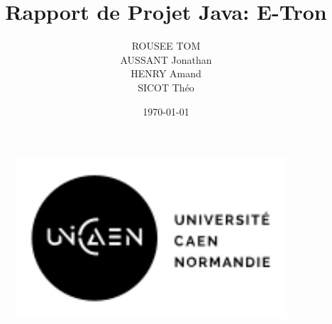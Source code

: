\documentclass{myClass}
\title{Rapport de Projet Java: E-Tron}
\author{ROUSEE TOM \\ AUSSANT Jonathan \\ HENRY Amand \\ SICOT Théo}
\date{\today}
\begin{document}
\begin{figure}
	\centering
	
		\includegraphics[width=0.9\textwidth]{images/2020_UNICAEN_LOGO_isotype-signature_horizontal_noir.png}
	
	\label{fig:game}
\end{figure}

\maketitle

\pagebreak









\nocite{*}

 
\end{document}
